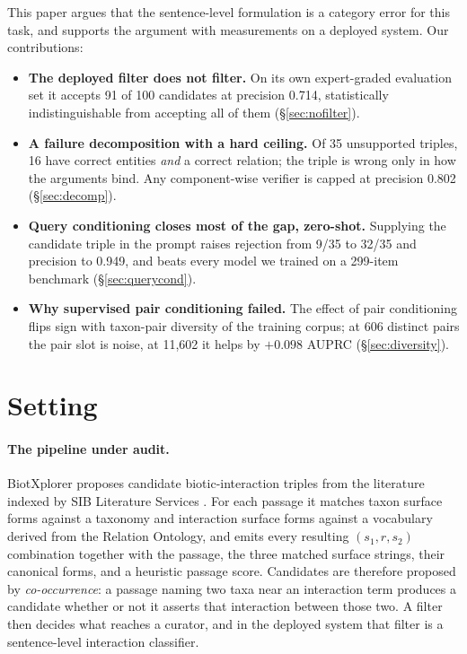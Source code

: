 \documentclass[11pt]{article}
\begin{document}
This paper argues that the sentence-level formulation is a category error for this task, and
supports the argument with measurements on a deployed system. Our contributions:

\begin{itemize}
\item \textbf{The deployed filter does not filter.} On its own expert-graded evaluation set it
      accepts 91 of 100 candidates at precision 0.714, statistically indistinguishable from
      accepting all of them (\S\ref{sec:nofilter}).
\item \textbf{A failure decomposition with a hard ceiling.} Of 35 unsupported triples, 16 have
      correct entities \emph{and} a correct relation; the triple is wrong only in how the
      arguments bind. Any component-wise verifier is capped at precision 0.802
      (\S\ref{sec:decomp}).
\item \textbf{Query conditioning closes most of the gap, zero-shot.} Supplying the candidate
      triple in the prompt raises rejection from 9/35 to 32/35 and precision to 0.949, and
      beats every model we trained on a 299-item benchmark (\S\ref{sec:querycond}).
\item \textbf{Why supervised pair conditioning failed.} The effect of pair conditioning flips
      sign with taxon-pair diversity of the training corpus; at 606 distinct pairs the pair slot
      is noise, at 11{,}602 it helps by $+0.098$ AUPRC (\S\ref{sec:diversity}).
\end{itemize}

\section{Setting}
\label{sec:setting}

\paragraph{The pipeline under audit.} BiotXplorer \citep{ruch2024biotxplorer} proposes candidate
biotic-interaction triples from the literature indexed by SIB Literature Services
\citep{gobeill2020sibils}. For each passage it matches taxon surface forms against a taxonomy and
interaction surface forms against a vocabulary derived from the Relation Ontology, and emits every
resulting $(s_1, r, s_2)$ combination together with the passage, the three matched surface
strings, their canonical forms, and a heuristic passage score. Candidates are therefore proposed
by \emph{co-occurrence}: a passage naming two taxa near an interaction term produces a candidate
whether or not it asserts that interaction between those two. A filter then decides what reaches
a curator, and in the deployed system that filter is a sentence-level interaction classifier.
\end{document}
